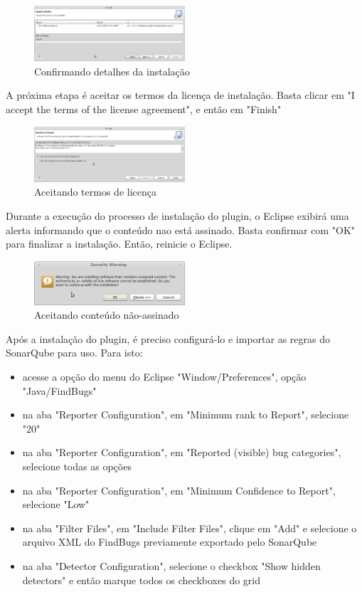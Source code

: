 \documentclass[12pt,journal,compsoc]{IEEEtran}
\begin{document}
\begin{figure}[ht!]
\centering
\includegraphics[width=0.5\textwidth]{img/eclipse-findbugs-04}
\caption{Confirmando detalhes da instalação}
\label{eclipse-findbugs-04}
\end{figure} 

A próxima etapa é aceitar os termos da licença de instalação. Basta clicar em "I accept the terms of the license agreement", e então em "Finish"

\begin{figure}[ht!]
\centering
\includegraphics[width=0.5\textwidth]{img/eclipse-findbugs-05}
\caption{Aceitando termos de licença}
\label{eclipse-findbugs-05}
\end{figure} 

Durante a execução do processo de instalação do plugin, o Eclipse exibirá uma alerta informando que o conteúdo nao está assinado. Basta confirmar com "OK" para finalizar a instalação. Então, reinicie o Eclipse.

\begin{figure}[ht!]
\centering
\includegraphics[width=0.5\textwidth]{img/eclipse-findbugs-06}
\caption{Aceitando conteúdo não-assinado}
\label{eclipse-findbugs-06}
\end{figure} 

Após a instalação do plugin, é preciso configurá-lo e importar as regras do SonarQube para uso. Para isto:

\begin{itemize}
\item acesse a opção do menu do Eclipse "Window/Preferences", opção "Java/FindBugs"
\item na aba "Reporter Configuration", em "Minimum rank to Report", selecione "20"
\item na aba "Reporter Configuration", em "Reported (visible) bug categories", selecione todas as opções
\item na aba "Reporter Configuration", em "Minimum Confidence to Report", selecione "Low"
\item na aba "Filter Files", em "Include Filter Files", clique em "Add" e selecione o arquivo XML do FindBugs previamente exportado pelo SonarQube
\item na aba "Detector Configuration", selecione o checkbox "Show hidden detectors" e então marque todos os checkboxes do grid
\end{itemize}
\end{document}
